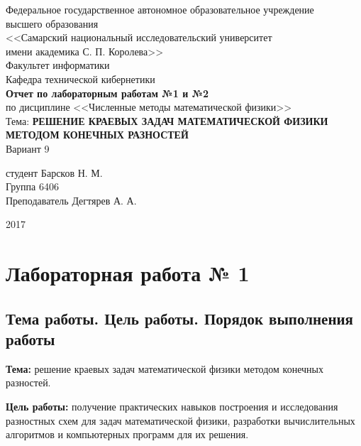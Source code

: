 \documentclass[a4paper,12pt,russian, fleqn]{extreport}
\begin{document}
	\begin{center}
		Федеральное государственное автономное образовательное учреждение \\
		высшего образования \\
		<<Самарский национальный исследовательский университет \\
		имени академика С. П. Королева>>\\
		\vspace{2cm}
		Факультет информатики \\
		\vspace{1cm}
		Кафедра технической кибернетики \\
		\vspace{3cm}
		\textbf{Отчет по лабораторным работам №1 и №2} \\
		по дисциплине <<Численные методы математической физики>> \\
		\vspace{1cm}
		Тема: \textbf{РЕШЕНИЕ КРАЕВЫХ ЗАДАЧ МАТЕМАТИЧЕСКОЙ ФИЗИКИ МЕТОДОМ КОНЕЧНЫХ РАЗНОСТЕЙ}\\
		\vspace{1cm}
		Вариант 9
	\end{center}

	 студент Барсков Н. М. \\
	Группа 6406\\
	Преподаватель Дегтярев А. А.
	\vfill
	\begin{center}
		2017
	\end{center}
	\thispagestyle{empty}
	\newpage
	\tableofcontents
	
	\chapter{Лабораторная работа № 1}
	\section{Тема работы. Цель работы. Порядок выполнения работы}
	\textbf{Тема:} решение краевых задач математической физики методом конечных разностей.
	
	\textbf{Цель работы:} получение практических навыков построения и исследования разностных схем для задач математической физики, разработки вычислительных алгоритмов и компьютерных программ для их решения.
	
\end{document}
